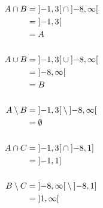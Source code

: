 \documentclass{article}
\begin{document}
\begin{align*}
  A \cap B &= \interval[open]{-1}{3} \cap \interval[open]{-8}{\infty} \\
           &= \interval[open]{-1}{3} \\
           &= A \\
  \\
  A \cup B &= \interval[open]{-1}{3} \cup \interval[open]{-8}{\infty} \\
           &= \interval[open]{-8}{\infty} \\
           &= B \\
  \\
  A \setminus B &= \interval[open]{-1}{3} \setminus \interval[open]{-8}{\infty} \\
           &= \emptyset \\
  \\
  A \cap C &= \interval[open]{-1}{3} \cap \interval[open left]{-8}{1} \\
           &= \interval[open left]{-1}{1} \\
  \\
  B \setminus C &= \interval[open]{-8}{\infty} \setminus \interval[open left]{-8}{1} \\
           &= \interval[open]{1}{\infty} \\
\end{align*}
\end{document}
